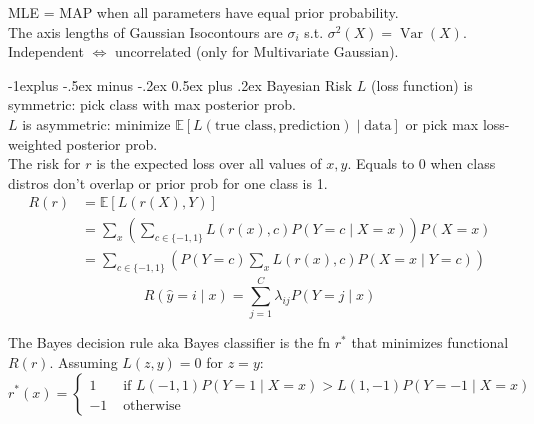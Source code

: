 \documentclass[10pt,landscape]{article}
\makeatletter
\DeclareMathOperator*{\Var}{Var}
\newcommand{\wrap}[3]{\left#1#3\right#2}
\def\E{\mathbb{E}}
\renewcommand{\subsection}{\@startsection{subsection}{2}{0mm}%
                                {-1explus -.5ex minus -.2ex}%
                                {0.5ex plus .2ex}%
                                {\normalfont\normalsize\bfseries}}
\makeatother
\begin{document}
\begin{multicols}{3}
MLE = MAP when all parameters have equal prior probability.
\\
The axis lengths of Gaussian Isocontours are $\sigma_i$ s.t. $\sigma^2(X)=\Var(X)$.
Independent $\Longleftrightarrow$ uncorrelated (only for Multivariate Gaussian).




\subsection{Bayesian Risk}
$L$ (loss function) is symmetric: pick class with max posterior prob.
\\
$L$ is asymmetric: minimize $\E[L(\text{true class}, \text{prediction}) \mid \text{data}]$ or pick max loss-weighted posterior prob.
\\

The risk for $r$ is the expected loss over all values of $x, y$. Equals to 0 when class distros don't overlap or prior prob for one class is 1.
{\small
  \begin{align*}
    R(r) &=\E[L(r(X), Y)] \\
    &=\sum_{x}\wrap(){\sum_{c\in\{-1,1\}} L(r(x), c) P(Y=c \mid X=x)} P(X=x) \\
    &=\sum_{c\in\{-1,1\}}\wrap(){ P(Y=c) \sum_{x} L(r(x), c) P(X=x \mid Y=c)}
  \end{align*}
}
\[
    R(\hat{y}=i \mid x)=\sum_{j=1}^{C} \lambda_{i j} P(Y=j \mid x)
\]

The Bayes decision rule aka Bayes classifier is the fn $r^{*}$ that minimizes functional $R(r)$. Assuming $L(z, y)=0$ for $z=y$:
{\scriptsize \[
r^{*}(x)=\left\{\begin{aligned}
1 & \text { if } L(-1,1) P(Y=1 \mid X=x)>L(1,-1) P(Y=-1 \mid X=x) \\
-1 & \text { otherwise }
\end{aligned}\right.
\]}



\end{multicols}
\end{document}
